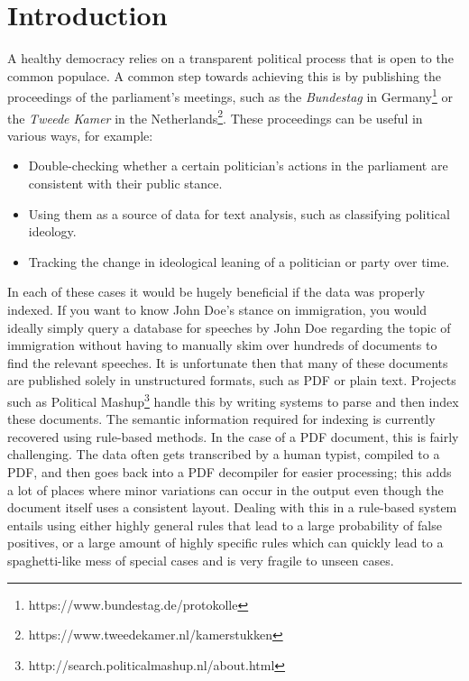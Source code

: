 \section{Introduction} A healthy democracy relies on a transparent political
process that is open to the common populace. A common step towards achieving this is by
publishing the proceedings of the parliament's meetings, such as the
\emph{Bundestag} in Germany\footnote{https://www.bundestag.de/protokolle} or the
\emph{Tweede Kamer} in the
Netherlands\footnote{https://www.tweedekamer.nl/kamerstukken}.  These
proceedings can be useful in various ways, for example:
\begin{itemize}
  \item Double-checking whether a certain politician's actions in the parliament
    are consistent with their public stance.
  \item Using them as a source of data for text analysis, such as classifying
    political ideology\citep{ideology}.
  \item Tracking the change in ideological leaning of a politician or party over
    time\cite{mittromney}.
\end{itemize}
In each of these cases it would be hugely beneficial if the data was properly
indexed. If you want to know John Doe's stance on immigration, you would ideally
simply query a database for speeches by John Doe regarding the topic of
immigration without having to manually skim over hundreds of documents to find
the relevant speeches.  It is unfortunate then that many of these documents are
published solely in unstructured formats, such as PDF or plain text.  Projects
such as Political Mashup\footnote{http://search.politicalmashup.nl/about.html}
handle this by writing systems to parse and then index these documents. The
semantic information required for indexing is currently recovered using
rule-based methods. In the case of a PDF document, this is fairly challenging.
The data often gets transcribed by a human typist, compiled to a PDF, and then
goes back into a PDF decompiler for easier processing; this adds a lot of places
where minor variations can occur in the output even though the document itself
uses a consistent layout.  Dealing with this in a rule-based system entails
using either highly general rules that lead to a large probability of false
positives, or a large amount of highly specific rules which can quickly lead to
a spaghetti-like mess of special cases and is very fragile to unseen cases.

